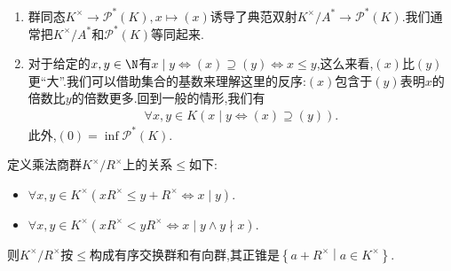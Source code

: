 \begin{remark}{}{}
	\begin{enumerate}
		\item 群同态$K^{\times}\to\mathscr{P}^{\ast}\left(K\right),x\mapsto\left(x\right)$诱导了典范双射$K^{\times}/A^{\ast}\to\mathscr{P}^{\ast}\left(K\right)$.我们通常把$K^{\times}/A^{\ast}$和$\mathscr{P}^{\ast}\left(K\right)$等同起来.
		\item 对于给定的$x,y\in\N$有$x\mid y\iff\left(x\right)\supseteq\left(y\right)\iff x\leq y$,这么来看,$\left(x\right)$比$\left(y\right)$更``大''.我们可以借助集合的基数来理解这里的反序:$\left(x\right)$包含于$\left(y\right)$表明$x$的倍数比$y$的倍数更多.回到一般的情形,我们有
		\begin{align*}
			\forall x,y\in K\left(x\mid y\iff\left(x\right)\supseteq\left(y\right)\right).
		\end{align*}
		此外,$\left(0\right)=\inf\mathscr{P}^{\ast}\left(K\right)$.
	\end{enumerate}
\end{remark}

\begin{proposition}{}{}
	定义乘法商群$K^{\times}/R^{\times}$上的关系$\leqslant$如下:
	\begin{itemize}
		\item $\forall x,y\in K^{\times}\left(xR^{\times}\leqslant y+R^{\times}\iff x\mid y\right)$.
		\item $\forall x,y\in K^{\times}\left(xR^{\times}<yR^{\times}\iff x\mid y\wedge y\nmid x\right)$.
	\end{itemize}
	则$K^{\times}/R^{\times}$按$\leqslant$构成有序交换群和有向群,其正锥是$\left\{a+R^{\times}\middle|a\in K^{\times}\right\}$.
\end{proposition}






































